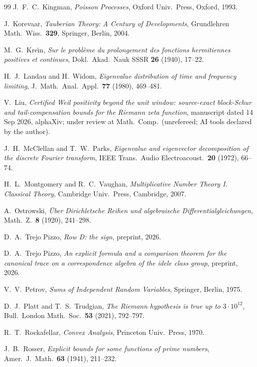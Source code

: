 \documentclass[11pt]{amsart}
\theoremstyle{definition}
\theoremstyle{remark}
\begin{document}
\begin{thebibliography}{99}
 J.~F.~C.~Kingman, \emph{Poisson Processes}, Oxford Univ.~Press, Oxford, 1993.

 J.~Korevaar, \emph{Tauberian Theory: A Century of Developments}, Grundlehren Math.\ Wiss.\ \textbf{329}, Springer, Berlin, 2004.

 M.~G.~Kre\u{\i}n, \emph{Sur le probl\`eme du prolongement des fonctions
hermitiennes positives et continues}, Dokl.~Akad.~Nauk SSSR \textbf{26} (1940), 17--22.

 H.~J.~Landau and H.~Widom, \emph{Eigenvalue distribution of time and frequency
limiting}, J.~Math.\ Anal.\ Appl.\ \textbf{77} (1980), 469--481.

 V.~Liu, \emph{Certified Weil positivity beyond the unit window: source-exact
block-Schur and tail-compensation bounds for the Riemann zeta function}, manuscript dated 14 Sep 2026,
alphaXiv; under review at Math.\ Comp.\ (unrefereed; AI tools declared by the author).

 J.~H.~McClellan and T.~W.~Parks, \emph{Eigenvalue and eigenvector decomposition of the discrete Fourier transform}, IEEE Trans.\ Audio Electroacoust.\ \textbf{20} (1972), 66--74.

 H.~L.~Montgomery and R.~C.~Vaughan, \emph{Multiplicative Number Theory I. Classical Theory}, Cambridge Univ.~Press, Cambridge, 2007.

 A.~Ostrowski, \emph{\"Uber Dirichletsche Reihen und algebraische Differentialgleichungen}, Math.\ Z.\ \textbf{8} (1920), 241--298.

 D.~A.~Trejo Pizzo, \emph{Row D: the sign}, preprint, 2026.

 D.~A.~Trejo Pizzo, \emph{An explicit formula and a comparison theorem for the canonical trace on a correspondence
algebra of the idele class group}, preprint, 2026.

 V.~V.~Petrov, \emph{Sums of Independent Random Variables}, Springer, Berlin, 1975.

 D.~J.~Platt and T.~S.~Trudgian, \emph{The Riemann hypothesis is true up to
$3\cdot10^{12}$}, Bull.\ London Math.\ Soc.\ \textbf{53} (2021), 792--797.

 R.~T.~Rockafellar, \emph{Convex Analysis}, Princeton Univ.~Press, 1970.

 J.~B.~Rosser, \emph{Explicit bounds for some functions of prime numbers}, Amer.\ J.\
Math.\ \textbf{63} (1941), 211--232.


\end{thebibliography}
\end{document}
